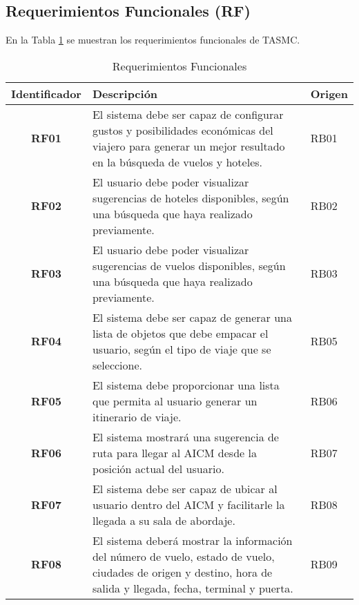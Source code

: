 \subsection{Requerimientos Funcionales (RF)}

En la Tabla \ref{tab:reqFuncionales} se muestran los requerimientos funcionales de TASMC.

\begin{table}[h]
	\begin{center}
		\begin{tabular}{|c|p{9.4cm}|p{1.5cm}|}
			\hline  \rowcolor[RGB]{51,153,255} 
				\textcolor{blanco}{\bf Identificador} &
				\textcolor{blanco}{\bf Descripción} &
				\textcolor{blanco}{\bf Origen} \\
			\hline 
				\textbf{RF01} &
				El sistema debe ser capaz de configurar gustos y posibilidades económicas del viajero para generar un mejor resultado en la búsqueda de vuelos y hoteles. &
				RB01 \\
      		\hline \rowcolor[RGB]{240,248,255}
      			\textbf{RF02} &
				El usuario debe poder visualizar sugerencias de hoteles disponibles,  según una búsqueda que haya realizado previamente. &
				RB02 \\
			\hline 
				\textbf{RF03} &
				El usuario debe poder visualizar sugerencias de vuelos disponibles, según una búsqueda que haya realizado previamente. &
				RB03 \\ 
			\hline \rowcolor[RGB]{240,248,255}
				\textbf{RF04} &
				El sistema debe ser capaz de generar una lista de objetos que debe empacar el usuario, según el tipo de viaje que se seleccione. &
				RB05 \\ 
			\hline 
				\textbf{RF05} &
				El sistema debe proporcionar una lista que permita al usuario generar un itinerario de viaje. &
				RB06 \\ 
			\hline \rowcolor[RGB]{240,248,255}
				\textbf{RF06} &
				El sistema mostrará una sugerencia de ruta para llegar al AICM desde la posición actual del usuario. &
				RB07 \\ 
			\hline 
				\textbf{RF07} &
				El sistema debe ser capaz de ubicar al usuario dentro del AICM y facilitarle la llegada a su sala de abordaje. &
				RB08 \\ 
			\hline \rowcolor[RGB]{240,248,255}
				\textbf{RF08} &
				El sistema deberá mostrar la información del número de vuelo, estado de vuelo, ciudades de origen y destino, 					hora de salida y llegada, fecha, terminal y puerta. &
				RB09 \\ 
			\hline
		\end{tabular}
	\end{center}
	\caption[Requerimientos Funcionales]{Requerimientos Funcionales} 
	\label{tab:reqFuncionales}
\end{table}
\clearpage
